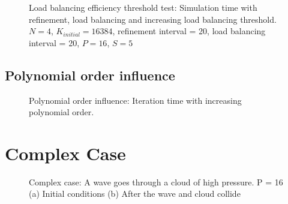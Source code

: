 \begin{figure}[H]
	\centering
	
	\caption{Load balancing efficiency threshold test: Simulation time with refinement, load balancing and increasing load balancing threshold. \(N = 4\), \(K_{initial} = 16384\), refinement interval = 20, load balancing interval = 20, \(P = 16\), \(S = 5\)}\label{fig:load_balancing_efficiency_threshold_s5}
\end{figure}

\subsection{Polynomial order influence}\label{subsection:results:load_balancing_performance:polynomial_order}

\begin{figure}[H]
	\centering
	
	\caption{Polynomial order influence: Iteration time with increasing polynomial order.}\label{fig:N_influence}
\end{figure}

\section{Complex Case}\label{section:results:complex_application}

\begin{figure}[H]
	\centering
	\hfill
	\caption{Complex case: A wave goes through a cloud of high pressure. P = 16 (a) Initial conditions (b) After the wave and cloud collide}\label{fig:cloud_p}
\end{figure}

